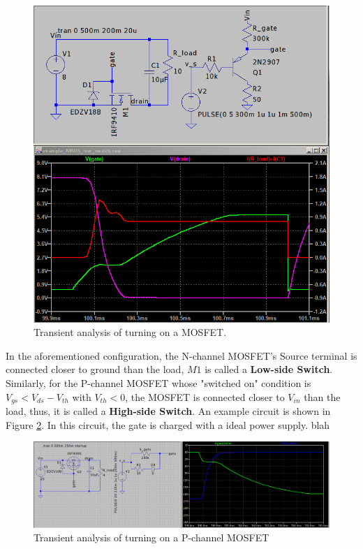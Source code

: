 \documentclass[main.tex]{subfiles}
\begin{document}
    \begin{figure}[!h]
        \centerline{\includegraphics[scale=0.4]{media/example_NMOS_low_switch.png}}
        \caption{Transient analysis of turning on a MOSFET.}
        \label{fig:NMOS_lowside_switch}
    \end{figure}

    \pagebreak 
    \justify
    In the aforementioned configuration, the N-channel MOSFET's Source terminal is connected closer to ground than the load, $M1$ is called a \textbf{Low-side Switch}. Similarly, for the P-channel MOSFET whose "switched on" condition is $V_{gs} < V_{ds}-V_{th}$ with $V_{th} < 0$, the MOSFET is connected closer to $V_{in}$ than the load, thus, it is called a \textbf{High-side Switch}. An example circuit is shown in Figure \ref{fig:gate_charge_curve_2}. In this circuit, the gate is charged with a ideal power supply. blah

    \begin{figure}[!h]
        \centerline{\includegraphics[width=\linewidth, height=0.5\linewidth]{media/gate_charge_curve_2.png}}
        \caption{Transient analysis of turning on a P-channel MOSFET}
        \label{fig:gate_charge_curve_2}
    \end{figure}
\end{document}
